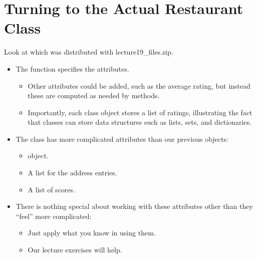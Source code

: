 \documentclass[letterpaper,10pt,english]{sphinxmanual}
\begin{document}
\section{Turning to the Actual Restaurant Class}
\label{\detokenize{lecture_notes/lec19_classes2:turning-to-the-actual-restaurant-class}}
Look at  which was distributed with lecture19\_files.zip.
\begin{itemize}
\item {} 
The  function specifies the attributes.
\begin{itemize}
\item {} 
Other attributes could be added, such as the average rating, but
instead these are computed as needed by methods.

\item {} 
Importantly, each class object stores a list of ratings,
illustrating the fact that classes can store data structures such
as lists, sets, and dictionaries.

\end{itemize}

\item {} 
The  class has more complicated attributes than our
previous objects:
\begin{itemize}
\item {} 
 object.

\item {} 
A list for the address entries.

\item {} 
A list of scores.

\end{itemize}

\item {} 
There is nothing special about working with these attributes other
than they “feel” more complicated:
\begin{itemize}
\item {} 
Just apply what you know in using them.

\item {} 
Our lecture exercises will help.

\end{itemize}

\end{itemize}
\end{document}

